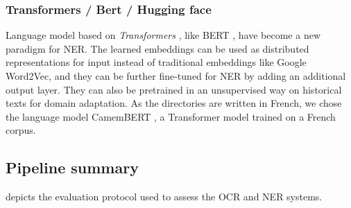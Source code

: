

\subsubsection{Transformers / Bert / Hugging face}
Language model based on \textit{Transformers} \cite{vaswani2017attention}, like BERT \cite{devlin2018bert}, have become a new paradigm for NER\cite{li2020}. 
The learned embeddings can be used as distributed representations for input instead of traditional embeddings like Google Word2Vec, and they can be further fine-tuned for NER by adding an additional output layer. 
They can also be pretrained in an unsupervised way on historical texts for domain adaptation.
As the directories are written in French, we chose the language model CamemBERT \cite{martin-etal-2020-camembert}, a Transformer model trained on a French corpus.

\subsection{Pipeline summary}

 depicts the evaluation protocol used to assess the OCR and NER systems. 


